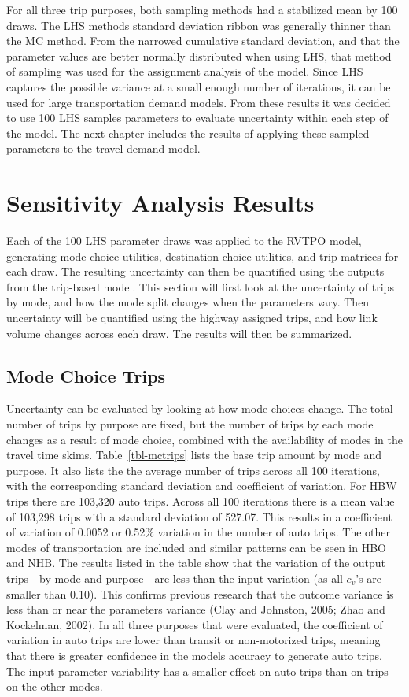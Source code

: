 \documentclass[
  futuretransp,
  submit,
  moreauthors,
]{Definitions/mdpi}
\begin{document}
For all three trip purposes, both sampling methods had a stabilized mean
by 100 draws. The LHS methods standard deviation ribbon was generally
thinner than the MC method. From the narrowed cumulative standard
deviation, and that the parameter values are better normally distributed
when using LHS, that method of sampling was used for the assignment
analysis of the model. Since LHS captures the possible variance at a
small enough number of iterations, it can be used for large
transportation demand models. From these results it was decided to use
100 LHS samples parameters to evaluate uncertainty within each step of
the model. The next chapter includes the results of applying these
sampled parameters to the travel demand model.


\section{Sensitivity Analysis Results}\label{sec-results}

Each of the 100 LHS parameter draws was applied to the RVTPO model,
generating mode choice utilities, destination choice utilities, and trip
matrices for each draw. The resulting uncertainty can then be quantified
using the outputs from the trip-based model. This section will first
look at the uncertainty of trips by mode, and how the mode split changes
when the parameters vary. Then uncertainty will be quantified using the
highway assigned trips, and how link volume changes across each draw.
The results will then be summarized.

\subsection{Mode Choice Trips}\label{mode-choice-trips}

Uncertainty can be evaluated by looking at how mode choices change. The
total number of trips by purpose are fixed, but the number of trips by
each mode changes as a result of mode choice, combined with the
availability of modes in the travel time skims. Table~\ref{tbl-mctrips}
lists the base trip amount by mode and purpose. It also lists the the
average number of trips across all 100 iterations, with the
corresponding standard deviation and coefficient of variation. For HBW
trips there are 103,320 auto trips. Across all 100 iterations there is a
mean value of 103,298 trips with a standard deviation of 527.07. This
results in a coefficient of variation of 0.0052 or 0.52\% variation in
the number of auto trips. The other modes of transportation are included
and similar patterns can be seen in HBO and NHB. The results listed in
the table show that the variation of the output trips - by mode and
purpose - are less than the input variation (as all \(c_v\)'s are
smaller than 0.10). This confirms previous research that the outcome
variance is less than or near the parameters variance (Clay and
Johnston, 2005; Zhao and Kockelman, 2002). In all three purposes that
were evaluated, the coefficient of variation in auto trips are lower
than transit or non-motorized trips, meaning that there is greater
confidence in the models accuracy to generate auto trips. The input
parameter variability has a smaller effect on auto trips than on trips
on the other modes.
\end{document}

